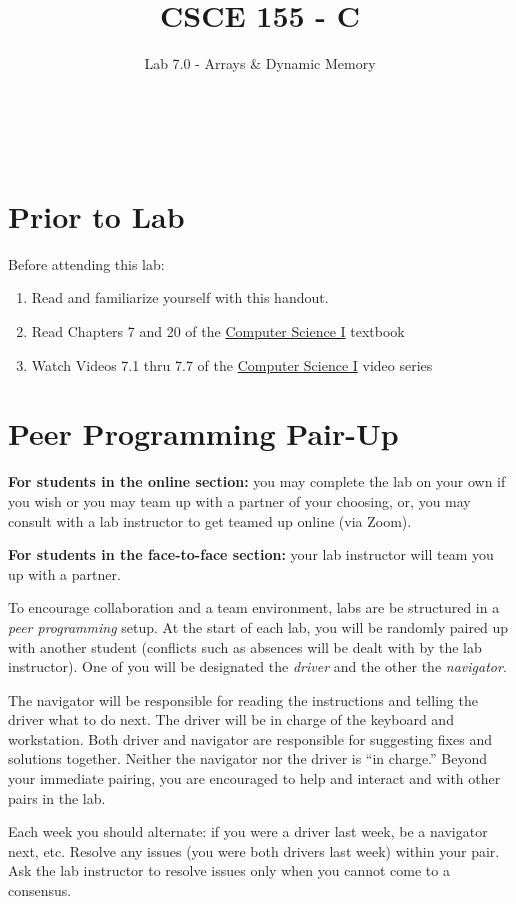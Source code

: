 \documentclass[12pt]{scrartcl}
\title{CSCE 155 - C}
\subtitle{Lab 7.0 - Arrays \& Dynamic Memory}
\author{~}
\date{~}
\begin{document}
\maketitle

\section*{Prior to Lab}

Before attending this lab:
\begin{enumerate}
  \item Read and familiarize yourself with this handout.
  \item Read Chapters 7 and 20 of the \href{http://cse.unl.edu/~cbourke/ComputerScienceOne.pdf}{Computer Science I} textbook
  \item Watch Videos 7.1 thru 7.7 of the \href{https://www.youtube.com/playlist?list=PL4IH6CVPpTZVkiEnCEOdGbYsFEdtKc5Bx}{Computer Science I} video series
\end{enumerate}

\section*{Peer Programming Pair-Up}

\textbf{For students in the online section:} you may complete
the lab on your own if you wish or you may team up with a partner
of your choosing, or, you may consult with a lab instructor to get
teamed up online (via Zoom).

\textbf{For students in the face-to-face section:} your
lab instructor will team you up with a partner.

To encourage collaboration and a team environment, labs are be
structured in a \emph{peer programming} setup.  At the start of
each lab, you will be randomly paired up with another student
(conflicts such as absences will be dealt with by the lab instructor).
One of you will be designated the \emph{driver} and the other
the \emph{navigator}.

The navigator will be responsible for reading the instructions and
telling the driver what to do next.  The driver will be in charge of the
keyboard and workstation.  Both driver and navigator are responsible
for suggesting fixes and solutions together.  Neither the navigator
nor the driver is ``in charge.''  Beyond your immediate pairing, you
are encouraged to help and interact and with other pairs in the lab.

Each week you should alternate: if you were a driver last week,
be a navigator next, etc.  Resolve any issues (you were both drivers
last week) within your pair.  Ask the lab instructor to resolve issues
only when you cannot come to a consensus.
\end{document}
